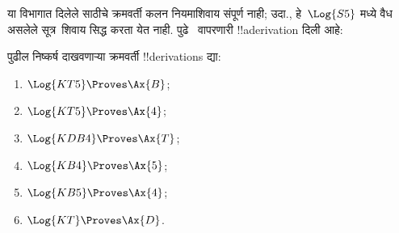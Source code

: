 \documentclass[../../../include/open-logic-section]{subfiles}
\begin{document}
\begin{ex}
या विभागात दिलेले  साठीचे क्रमवर्ती कलन \Cut{} नियमाशिवाय
संपूर्ण नाही; उदा.,  हे~$\Log{S5}$ मध्ये वैध असलेले
सूत्र~\Cut शिवाय सिद्ध करता येत नाही. पुढे~\Cut
वापरणारी !!a{derivation} दिली आहे:
\begin{prooftree}
\end{prooftree}
\end{ex}

\begin{prob}
पुढील निष्कर्ष दाखवणाऱ्या क्रमवर्ती !!{derivation}s द्या:
  \begin{enumerate}
  \item $\Log{KT5} \Proves \Ax{B}$;
  \item $\Log{KT5} \Proves \Ax{4}$;
  \item $\Log{KDB4} \Proves \Ax{T}$;
  \item $\Log{KB4} \Proves \Ax{5}$;
  \item $\Log{KB5} \Proves \Ax{4}$;
  \item $\Log{KT} \Proves \Ax{D}$.
  \end{enumerate}
\end{prob}
\end{document}
